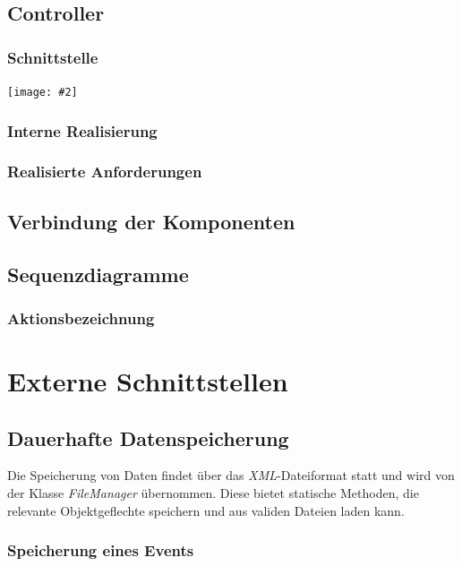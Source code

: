 \documentclass[11pt]{article}
\newcommand{\includediagram}[2]{
	\vspace{0.5cm}
	\begin{center}
		\texttt{[image: \#2]}
	\end{center}
	\vspace{0.5cm}
}
\begin{document}
\subsection{Controller}

\subsubsection{Schnittstelle}

\includediagram{1.0}{controller.png}

\subsubsection{Interne Realisierung}

\subsubsection{Realisierte Anforderungen}

\subsection{Verbindung der Komponenten}

\subsection{Sequenzdiagramme}

\subsubsection{Aktionsbezeichnung}

\section{Externe Schnittstellen}

\subsection{Dauerhafte Datenspeicherung}

Die Speicherung von Daten findet über das \textit{XML}-Dateiformat statt und wird von der Klasse \textit{FileManager} übernommen. Diese bietet statische Methoden, die relevante Objektgeflechte speichern und aus validen Dateien laden kann.

\subsubsection{Speicherung eines Events}
\end{document}
